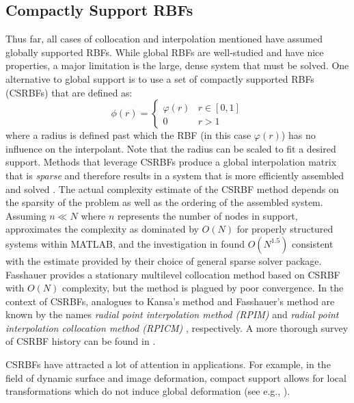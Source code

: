 \documentclass{report}
\begin{document}
{


\subsection{Compactly Support RBFs} 

Thus far, all cases of collocation and interpolation mentioned have assumed globally supported RBFs. While global RBFs are well-studied and have nice properties, a major limitation is the large, dense system that must be solved. One alternative to global support is to use a set of compactly supported RBFs (CSRBFs) that are defined as: 
\begin{equation}
\phi(r) = \begin{cases} \varphi(r) & r \in [0,1]\\
0 & r > 1
\end{cases}
\label{eqn:csrbf}
\end{equation}
where a radius is defined past which the RBF (in this case $\varphi(r)$) has no influence on the interpolant. Note that the radius can be scaled to fit a desired support. Methods that leverage CSRBFs produce a global interpolation matrix that is \emph{sparse} and therefore results in a system that is more efficiently assembled and solved \cite{Fasshauer2007}. The actual complexity estimate of the CSRBF method depends on the sparsity of the problem as well as the ordering of the assembled system. Assuming $n \ll N$ where $n$ represents the number of nodes in support, \cite{Zhang2004} approximates the complexity as dominated by $O(N)$ for properly structured systems within MATLAB, and the investigation in \cite{Morse2005} found $O(N^{1.5})$ consistent with the estimate provided by their choice of general sparse solver package. Fasshauer \cite{Fasshauer2007} provides a stationary multilevel collocation method based on CSRBF with $O(N)$ complexity, but the method is plagued by poor convergence. In the context of CSRBFs, analogues to Kansa's method and Fasshauer's method are known by the names \emph{radial point interpolation method (RPIM)} \cite{Wang2002} and \emph{radial point interpolation collocation method (RPICM)} \cite{Liu2005}, respectively. A more thorough survey of CSRBF history can be found in \cite{Fasshauer2007,Iske2004}.

CSRBFs have attracted a lot of attention in applications. For example, in the field of dynamic surface and image deformation, compact support allows for local transformations which do not induce global deformation (see e.g., \cite{Yang2008, Lin2009, Correa2007}). 

}
\end{document}
